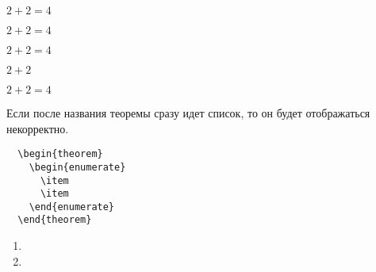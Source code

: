 \begin{theorem}\label{th:1}
    $2+2=4$
\end{theorem}

\begin{proposition}
    $2+2=4$
\end{proposition}

\begin{corollary}
    $2+2=4$
\end{corollary}

\begin{problem}
$2+2$
\end{problem}

\begin{solution}
    $2+2=4$
\end{solution}

Если после названия теоремы сразу идет список, то он будет отображаться некорректно.
\begin{verbatim}
  \begin{theorem}
    \begin{enumerate}
      \item
      \item
    \end{enumerate}
  \end{theorem}
\end{verbatim}
\begin{theorem}
  \begin{enumerate}
    \item
    \item
  \end{enumerate}
\end{theorem}

